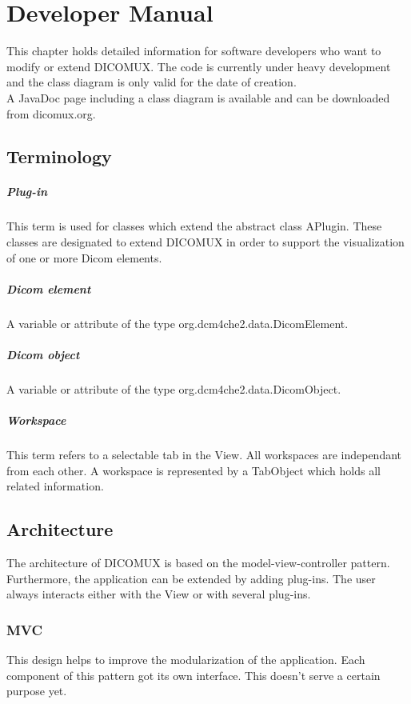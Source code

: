 %
%
\chapter{Developer Manual}
This chapter holds detailed information for software developers who want to modify or extend DICOMUX. The code is currently under heavy development and the class diagram is only valid for the date of creation.\\
A JavaDoc page including a class diagram is available and can be downloaded from dicomux.org.

\section{Terminology}
\paragraph{Plug-in}
This term is used for classes which extend the abstract class APlugin. These classes are designated to extend DICOMUX in order to support the visualization of one or more Dicom elements.
\paragraph{Dicom element}
A variable or attribute of the type org.dcm4che2.data.DicomElement.
\paragraph{Dicom object}
A variable or attribute of the type org.dcm4che2.data.DicomObject.
\paragraph{Workspace}
This term refers to a selectable tab in the View. All workspaces are independant from each other. A workspace is represented by a TabObject which holds all related information.

\section{Architecture}
The architecture of DICOMUX is based on the model-view-controller pattern. Furthermore, the application can be extended by adding plug-ins. The user always interacts either with the View or with several plug-ins.

\subsection{MVC}
This design helps to improve the modularization of the application. Each component of this pattern got its own interface. This doesn't serve a certain purpose yet.

